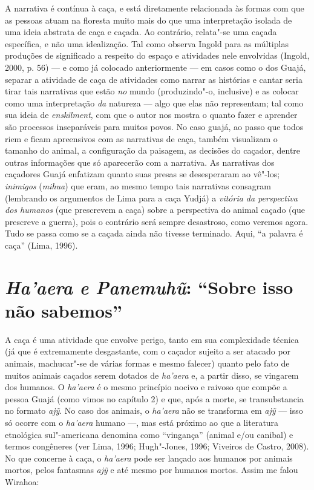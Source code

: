 A narrativa é contínua à caça, e está diretamente relacionada às formas
com que as pessoas atuam na floresta muito mais do que uma interpretação
isolada de uma ideia abstrata de caça e caçada. Ao contrário, relata"-se
uma caçada específica, e não uma idealização. Tal como observa Ingold
para as múltiplas produções de significado a respeito do espaço e
atividades nele envolvidas (Ingold, 2000, p. 56) --- e como já colocado
anteriormente --- em casos como o dos Guajá, separar a atividade de caça
de atividades como narrar as histórias e cantar seria tirar tais
narrativas que estão \emph{no} mundo (produzindo"-o, inclusive) e as
colocar como uma interpretação \emph{da} natureza --- algo que elas não
representam; tal como sua ideia de \emph{enskilment}, com que o autor
nos mostra o quanto fazer e aprender são processos inseparáveis para
muitos povos. No caso guajá, ao passo que todos riem e ficam apreensivos
com as narrativas de caça, também visualizam o tamanho do animal, a
configuração da paisagem, as decisões do caçador, dentre outras
informações que só aparecerão com a narrativa. As narrativas dos
caçadores Guajá enfatizam quanto suas presas se desesperaram ao vê"-los;
\emph{inimigos} (\emph{mihua}) que eram, ao mesmo tempo tais narrativas
consagram (lembrando os argumentos de Lima para a caça Yudjá) a
\emph{vitória da perspectiva dos humanos} (que prescrevem a caça) sobre
a perspectiva do animal caçado (que prescreve a guerra), pois o
contrário será sempre desastroso, como veremos agora. Tudo se passa como
se a caçada ainda não tivesse terminado. Aqui, ``a palavra é caça'' (Lima,
1996).

\section{\emph{Ha'aera e Panemuhũ}: ``Sobre isso não sabemos''}

A caça é uma atividade que envolve perigo, tanto em sua complexidade
técnica (já que é extremamente desgastante, com o caçador sujeito a ser
atacado por animais, machucar"-se de várias formas e mesmo falecer)
quanto pelo fato de muitos animais caçados serem dotados de
\emph{ha'aera} e, a partir disso, se vingarem dos humanos. O
\emph{ha'aera} é o mesmo princípio nocivo e raivoso que compõe a pessoa
Guajá (como vimos no capítulo 2) e que, após a morte, se transubstancia
no formato \emph{ajỹ}. No caso dos animais, o \emph{ha'aera} não se
transforma em \emph{ajỹ} --- isso só ocorre com o \emph{ha'aera} humano ---,
mas está próximo ao que a literatura etnológica sul"-americana denomina
como ``vingança'' (animal e/ou canibal) e termos congêneres (ver Lima,
1996; Hugh"-Jones, 1996; Viveiros de Castro, 2008). No que concerne à
caça, o \emph{ha'aera} pode ser lançado aos humanos por animais mortos,
pelos fantasmas \emph{ajỹ} e até mesmo por humanos mortos. Assim me
falou Wirahoa:

